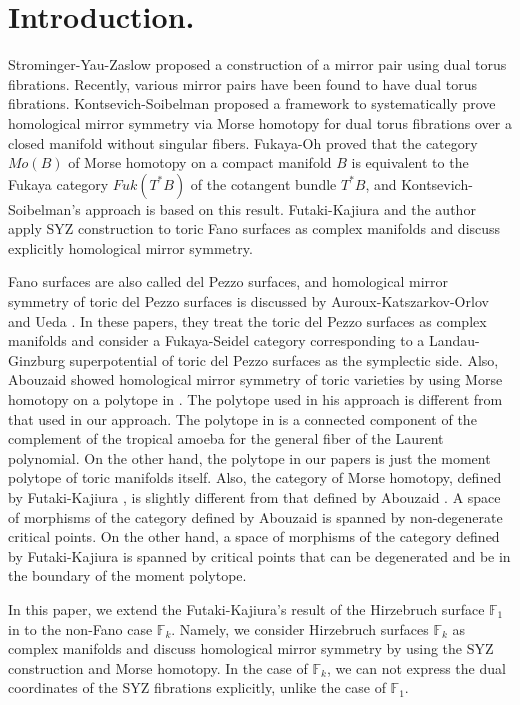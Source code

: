 \documentclass[12pt,reqno]{amsart}
\newcommand{\F}{{\mathbb{F}}}
\newcommand{\Fk}{{\F_k}}
\theoremstyle{definition}
\begin{document}
\section{Introduction.}
 Strominger-Yau-Zaslow \cite{SYZ} proposed a construction of a mirror pair using dual torus fibrations. Recently, various mirror pairs have been found to have dual torus fibrations. Kontsevich-Soibelman \cite{KoSo:torus} proposed a framework to systematically prove homological mirror symmetry via Morse homotopy for dual torus fibrations over a closed manifold without singular fibers.  Fukaya-Oh \cite{FO} proved that the category $Mo(B)$ of Morse homotopy on a compact manifold $B$ is equivalent to the Fukaya category $Fuk(T^*B)$ of the cotangent bundle $T^*B$, and Kontsevich-Soibelman's approach is based on this result. Futaki-Kajiura and the author apply SYZ construction to toric Fano surfaces as complex manifolds and discuss explicitly homological mirror symmetry.\par
Fano surfaces are also called del Pezzo surfaces, and homological mirror symmetry of toric del Pezzo surfaces is discussed by Auroux-Katszarkov-Orlov \cite{AKO} and Ueda \cite{U}. In these papers, they treat the toric del Pezzo surfaces as complex manifolds and consider a Fukaya-Seidel category \cite{seidel} corresponding to a Landau-Ginzburg superpotential of toric del Pezzo surfaces as the symplectic side. Also, Abouzaid showed homological mirror symmetry of toric varieties by using Morse homotopy on a polytope in \cite{A}.
The polytope used in his approach is different from that used in our approach.
 The polytope in \cite{A} is a connected component of the complement of the tropical amoeba for the general fiber of the Laurent polynomial. On the other hand, the polytope in our papers is just the moment polytope of toric manifolds itself.
 Also, the category of Morse homotopy, defined by Futaki-Kajiura \cite{fut-kaj1}, is slightly different from that defined by Abouzaid \cite{A}. A space of morphisms of the category defined by Abouzaid is spanned by non-degenerate critical points. On the other hand,  a space of morphisms of the category defined by Futaki-Kajiura is spanned by critical points that can be degenerated and be in the boundary of the moment polytope.
\par
In this paper, we extend the Futaki-Kajiura's result of the Hirzebruch surface $\F_1$ in \cite{fut-kaj2} to the non-Fano case $\Fk$.
Namely, we consider Hirzebruch surfaces $\Fk$ as complex manifolds and discuss homological mirror symmetry by using the SYZ construction and Morse homotopy. In the case of $\Fk$, we can not express the dual coordinates of the SYZ fibrations explicitly, unlike the case of $\F_1$.
\end{document}
